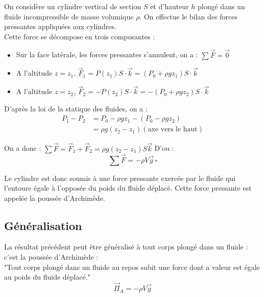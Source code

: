 On considère un cylindre vertical de section \(S\) et d'hauteur \(h\) plongé dans un fluide incompressible de masse volumique \(\rho \). On effectue le bilan des forces pressantes appliquées aux cylindres. \\
Cette force se décompose en trois composantes : 
\begin{itemize}
    \item Sur la face latérale, les forces pressantes s'annulent, on a : \(\sum \vec{F} = \vec{0}\)
    \item A l'altitude \(z = z_{1}\), \(\vec{F}_{1} = P(z_{1})S \cdot \vec{k} = (P_{0}+\rho g z_{1})S \cdot \vec{k}\)   
    \item A l'altitude \(z = z_{2}\), \(\vec{F}_{2} = -P(z_{2})S \cdot \vec{k} = -(P_{0}+\rho g z_{2})S \cdot \vec{k}\)
\end{itemize}
D'après la loi de la statique des fluides, on a : \\
\begin{eqnarray*}
    P_{1}-P_{2} &= P_{0} -\rho g z_{1} - (P_{0} - \rho g z_{2})\\
    &= \rho g(z_{2}-z_{1}) (\text{axe vers le haut})
\end{eqnarray*}

On a donc : \(\sum \vec{F} = \vec{F}_{1} + \vec{F}_{2} = \rho g (z_{2} - z_{1})S \vec{k}\) D'ou : \\
\[
    \sum \vec{F} = -\rho V \vec{g} \, \square
\] 

Le cylindre est donc soumis à une force pressante exercée par le fluide qui l'entoure égale à l'opposée du poids du fluide déplacé. Cette force pressante est appelée la poussée d'Archimède. 

\subsection{Généralisation}

\begin{theorem}[Généralisation]\label{thm:}
    La résultat précédent peut être généralisé à tout corps plongé dans un fluide : c'est la poussée d'Archimède : \\
    "Tout corps plongé dans un fluide au repos subit une force dont a valeur est égale au poids du fluide déplacé."   
    \[
        \vec{\Pi} _{A} = -\rho V \vec{g}
    \]
\end{theorem}


